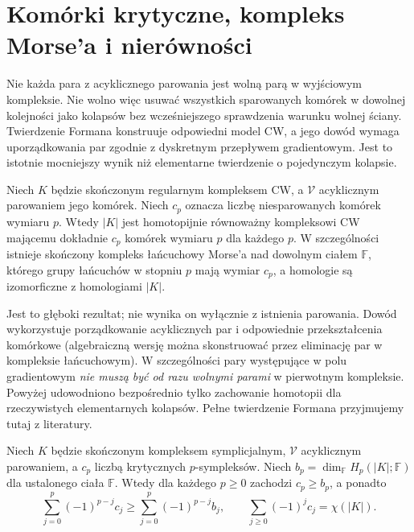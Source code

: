 \section{Komórki krytyczne, kompleks Morse'a i nierówności}
\label{sec:tg-forman-inequalities}

\begin{uwaga}
Nie każda para z acyklicznego parowania jest wolną parą
w wyjściowym kompleksie. Nie wolno więc usuwać wszystkich
sparowanych komórek w dowolnej kolejności jako kolapsów
bez wcześniejszego sprawdzenia warunku wolnej ściany.
Twierdzenie Formana konstruuje odpowiedni model CW,
a jego dowód wymaga uporządkowania par zgodnie z dyskretnym
przepływem gradientowym. Jest to istotnie mocniejszy wynik
niż elementarne twierdzenie o pojedynczym kolapsie.
\end{uwaga}

\begin{twierdzenie}
\label{thm:tg-forman-main}
Niech $K$ będzie skończonym regularnym kompleksem CW,
a $\mathcal V$ acyklicznym parowaniem jego komórek.
Niech $c_p$ oznacza liczbę niesparowanych komórek
wymiaru $p$. Wtedy $|K|$ jest homotopijnie równoważny
kompleksowi CW mającemu dokładnie $c_p$ komórek
wymiaru $p$ dla każdego $p$.
W szczególności istnieje skończony kompleks łańcuchowy
Morse'a nad dowolnym ciałem $\mathbb F$, którego grupy łańcuchów
w stopniu $p$ mają wymiar $c_p$, a homologie są
izomorficzne z homologiami $|K|$.
\end{twierdzenie}

\begin{uwaga}
Jest to głęboki rezultat; nie wynika on wyłącznie z
istnienia parowania. Dowód wykorzystuje porządkowanie
acyklicznych par i odpowiednie przekształcenia komórkowe
(algebraiczną wersję można skonstruować przez eliminację
par w kompleksie łańcuchowym). W szczególności pary
występujące w polu gradientowym \emph{nie muszą być
od razu wolnymi parami} w pierwotnym kompleksie.
Powyżej udowodniono bezpośrednio tylko zachowanie
homotopii dla rzeczywistych elementarnych kolapsów.
Pełne twierdzenie Formana przyjmujemy tutaj z literatury.
\end{uwaga}

\begin{twierdzenie}
\label{thm:tg-forman-ineq}
Niech $K$ będzie skończonym kompleksem symplicjalnym,
$\mathcal V$ acyklicznym parowaniem, a $c_p$ liczbą
krytycznych $p$-sympleksów. Niech
$b_p=\dim_{\mathbb F}H_p(|K|;\mathbb F)$
dla ustalonego ciała $\mathbb F$. Wtedy dla każdego
$p\ge0$ zachodzi $c_p\ge b_p$, a ponadto
\[
 \sum_{j=0}^p(-1)^{p-j}c_j
 \ge \sum_{j=0}^p(-1)^{p-j}b_j,
 \qquad
 \sum_{j\ge0}(-1)^jc_j=\chi(|K|).
\]
\end{twierdzenie}

